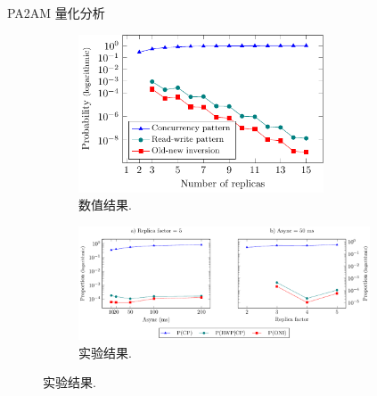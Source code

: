 \begin{frame}{PA2AM 量化分析}
  \begin{figure}
	\begin{subfigure}{0.40\textwidth}
	  \centering
	  \includegraphics[width = 0.80\textwidth]{figs/oni-pgfplot.pdf}
	  \caption{数值结果.}
	\end{subfigure}%
	\begin{subfigure}{0.60\textwidth}
	  \centering
	  \includegraphics[width = 0.95\textwidth]{figs/experiment-oni-pgfplot.pdf}
	  \caption{实验结果.}
	\end{subfigure}
  \end{figure}


\end{frame}
